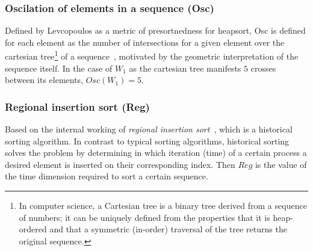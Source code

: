 \subsubsection{Oscilation of elements in a sequence (Osc)}
Defined by Levcopoulos as a metric of presortnedness for heapsort, Osc is defined for each element as the number of intersections for a given element over the cartesian tree\footnote{In computer science, a Cartesian tree is a binary tree derived from a sequence of numbers; it can be uniquely defined from the properties that it is heap-ordered and that a symmetric (in-order) traversal of the tree returns the original sequence.} of a sequence~\cite{Levcopoulos_Petersson_1993}, motivated by the geometric interpretation of the sequence itself. In the case of $W_1$ as the cartesian tree manifests $5$ crosses between its  elements, $Osc(W_1) = 5$.

\subsubsection{Regional insertion sort (Reg)}
Based on the internal working of \textit{regional insertion sort}~\cite{Cantoni_Creutzburg_Levialdi_Wolf_1989}, which is a historical sorting algorithm. In contrast to typical sorting algorithms, historical sorting solves the problem by determining in which iteration (time) of a certain process a desired element is inserted on their corresponding index. Then $Reg$ is the value of the time dimension required to sort a certain sequence. %
